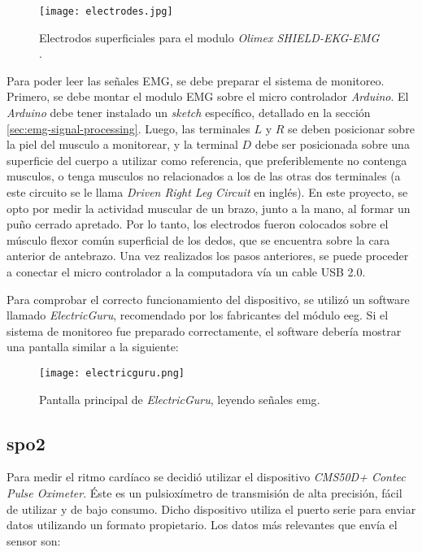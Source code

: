 \begin{figure}[H]
	\centering
    \texttt{[image: electrodes.jpg]}
    \caption{Electrodos superficiales para el modulo \emph{Olimex SHIELD-EKG-EMG} \cite{emg-electrodes}.}
	\label{fig:emg-electrodes}
\end{figure}

Para poder leer las señales EMG, se debe preparar el sistema de monitoreo.  Primero, se debe montar el modulo EMG sobre el micro controlador \emph{Arduino}.  El \emph{Arduino} debe tener instalado un \emph{sketch} específico, detallado en la sección \ref{sec:emg-signal-processing}. Luego, las terminales $L$ y $R$ se deben posicionar sobre la piel del musculo a monitorear, y la terminal $D$ debe ser posicionada sobre una superficie del cuerpo a utilizar como referencia, que preferiblemente no contenga musculos, o tenga musculos no relacionados a los de las otras dos terminales (a este circuito se le llama \emph{Driven Right Leg Circuit} en inglés). En este proyecto, se opto por medir la actividad muscular de un brazo, junto a la mano, al formar un puño cerrado apretado. Por lo tanto, los electrodos fueron colocados sobre el músculo flexor común superficial de los dedos, que se encuentra sobre la cara anterior de antebrazo\cite{emg-signals-wrist}. Una vez realizados los pasos anteriores, se puede proceder a conectar el micro controlador a la computadora vía un cable USB 2.0.

Para comprobar el correcto funcionamiento del dispositivo, se utilizó un software llamado \emph{ElectricGuru}, recomendado por los fabricantes del módulo \acrshort{eeg}. Si el sistema de monitoreo fue preparado correctamente, el software debería mostrar una pantalla similar a la siguiente:

\begin{figure}[H]
	\centering
    \texttt{[image: electricguru.png]}
    \caption{Pantalla principal de \emph{ElectricGuru}, leyendo señales \acrshort{emg}.}
	\label{fig:emg-electricguru}
\end{figure}

\subsection{\acrshort{spo2}}

Para medir el ritmo cardíaco se decidió utilizar el dispositivo \emph{CMS50D+ Contec Pulse Oximeter}. Éste es un pulsioxímetro de transmisión de alta precisión, fácil de utilizar y de bajo consumo. Dicho dispositivo utiliza el puerto serie para enviar datos utilizando un formato propietario. Los datos más relevantes que envía el sensor son:

